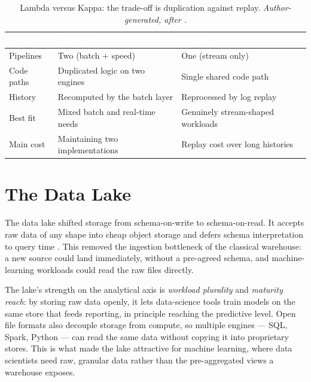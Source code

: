 \begin{table}[H]
\centering
\renewcommand{\arraystretch}{1.35}
\caption{Lambda versus Kappa: the trade-off is duplication against replay. \textit{Author-generated, after \parencite{marz2015, kreps2014}.}}
\label{tab:lambda-kappa}
\begin{tabularx}{\linewidth}{|>{\raggedright\arraybackslash}p{2.8cm}|>{\raggedright\arraybackslash}X|>{\raggedright\arraybackslash}X|}
\hline
\rowcolor{tblheader}
\textcolor{white}{\textbf{Aspect}} &
\textcolor{white}{\textbf{Lambda}} &
\textcolor{white}{\textbf{Kappa}} \\
\hline
Pipelines & Two (batch + speed) & One (stream only) \\
Code paths & Duplicated logic on two engines & Single shared code path \\
History & Recomputed by the batch layer & Reprocessed by log replay \\
Best fit & Mixed batch and real-time needs & Genuinely stream-shaped workloads \\
Main cost & Maintaining two implementations & Replay cost over long histories \\
\hline
\end{tabularx}
\end{table}

\section{The Data Lake}
\label{sec:ch2-lake}

The data lake shifted storage from schema-on-write to schema-on-read. It accepts raw data of any shape into cheap object storage and defers schema interpretation to query time \parencite{nambiar2022}. This removed the ingestion bottleneck of the classical warehouse: a new source could land immediately, without a pre-agreed schema, and machine-learning workloads could read the raw files directly.

The lake's strength on the analytical axis is \textit{workload plurality} and \textit{maturity reach}: by storing raw data openly, it lets data-science tools train models on the same store that feeds reporting, in principle reaching the predictive level. Open file formats also decouple storage from compute, so multiple engines --- SQL, Spark, Python --- can read the same data without copying it into proprietary stores. This is what made the lake attractive for machine learning, where data scientists need raw, granular data rather than the pre-aggregated views a warehouse exposes.

